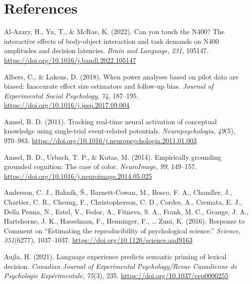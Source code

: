 \documentclass[
  12pt,
  man,floatsintext]{apa7}
\newlength{\cslhangindent}
\newlength{\cslentryspacingunit} %
\newenvironment{CSLReferences}[2] %
 {%
  \setlength{\parindent}{0pt}
  \ifodd #1
  \let\oldpar\par
  \def\par{\hangindent=\cslhangindent\oldpar}
  \fi
  \setlength{\parskip}{#2\cslentryspacingunit}
 }%
 {}
\begin{document}
\clearpage

\hypertarget{references}{%
\section{References}\label{references}}

\hypertarget{refs}{}
\begin{CSLReferences}{1}{0}
\leavevmode{}%
Al-Azary, H., Yu, T., \& McRae, K. (2022). Can you touch the {N400}? {The} interactive effects of body-object interaction and task demands on {N400} amplitudes and decision latencies. \emph{Brain and Language}, \emph{231}, 105147. \url{https://doi.org/10.1016/j.bandl.2022.105147}

\leavevmode{}%
Albers, C., \& Lakens, D. (2018). When power analyses based on pilot data are biased: {Inaccurate} effect size estimators and follow-up bias. \emph{Journal of Experimental Social Psychology}, \emph{74}, 187--195. \url{https://doi.org/10.1016/j.jesp.2017.09.004}

\leavevmode{}%
Amsel, B. D. (2011). Tracking real-time neural activation of conceptual knowledge using single-trial event-related potentials. \emph{Neuropsychologia}, \emph{49}(5), 970--983. \url{https://doi.org/10.1016/j.neuropsychologia.2011.01.003}

\leavevmode{}%
Amsel, B. D., Urbach, T. P., \& Kutas, M. (2014). Empirically grounding grounded cognition: {The} case of color. \emph{NeuroImage}, \emph{99}, 149--157. \url{https://doi.org/10.1016/j.neuroimage.2014.05.025}

\leavevmode{}%
Anderson, C. J., Bahník, Š., Barnett-Cowan, M., Bosco, F. A., Chandler, J., Chartier, C. R., Cheung, F., Christopherson, C. D., Cordes, A., Cremata, E. J., Della Penna, N., Estel, V., Fedor, A., Fitneva, S. A., Frank, M. C., Grange, J. A., Hartshorne, J. K., Hasselman, F., Henninger, F., \ldots{} Zuni, K. (2016). Response to {Comment} on {``{Estimating} the reproducibility of psychological science.''} \emph{Science}, \emph{351}(6277), 1037--1037. \url{https://doi.org/10.1126/science.aad9163}

\leavevmode{}%
Aujla, H. (2021). Language experience predicts semantic priming of lexical decision. \emph{Canadian Journal of Experimental Psychology/Revue Canadienne de Psychologie Expérimentale}, \emph{75}(3), 235. \url{https://doi.org/10.1037/cep0000255}


\end{CSLReferences}
\end{document}
